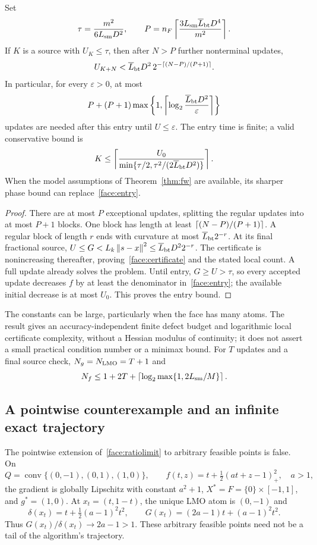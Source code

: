 \begin{corollary}
\label{face:local}
Set
\[
 \tau=\frac{m^2}{6L_{\rm sm}D^2},\qquad
 P=n_F\left\lceil\frac{3L_{\rm sm}\overline L_{\rm bt}D^4}{m^2}\right\rceil.
\]
If $K$ is a source with $U_K\le\tau$, then after $N>P$ further
nonterminal updates,
\begin{equation}\label{face:certificate}
 U_{K+N}<\overline L_{\rm bt}D^2\,2^{-\left\lceil(N-P)/(P+1)\right\rceil}.
\end{equation}
In particular, for every $\varepsilon>0$, at most
\begin{equation}\label{face:localcount}
 P+(P+1)\max\left\{1,
 \left\lceil\log_2\frac{\overline L_{\rm bt}D^2}{\varepsilon}\right\rceil\right\}
\end{equation}
updates are needed after this entry until $U\le\varepsilon$. The entry
time is finite; a valid conservative bound is
\begin{equation}\label{face:entry}
 K\le\left\lceil\frac{U_0}{\min\{\tau/2,\tau^2/(2\overline L_{\rm bt}D^2)\}}\right\rceil.
\end{equation}
When the model assumptions of Theorem~\ref{thm:fw} are available, its
sharper phase bound can replace~\eqref{face:entry}.
\end{corollary}
\begin{proof}
There are at most $P$ exceptional updates, splitting the regular
updates into at most $P+1$ blocks. One block has length at least
$\left\lceil(N-P)/(P+1)\right\rceil$. A regular block of length $r$ ends with
curvature at most $\overline L_{\rm bt}2^{-r}$. At its final
fractional source, $U\le G< L_k\left\|s-x\right\|^2\le
\overline L_{\rm bt}D^2 2^{-r}$. The certificate is nonincreasing
thereafter, proving~\eqref{face:certificate} and the stated local
count. A full update already solves the problem. Until entry,
$G\ge U>\tau$, so every accepted update decreases $f$ by at least
the denominator in~\eqref{face:entry}; the available initial decrease
is at most $U_0$. This proves the entry bound.
\end{proof}
The constants can be large, particularly when the face has many
atoms. The result gives an accuracy-independent finite defect budget
and logarithmic local certificate complexity, without a Hessian
modulus of continuity; it does not assert a small practical condition
number or a minimax bound. For $T$ updates and a final source check,
$N_g=N_{\rm LMO}=T+1$ and
\[
 N_f\le1+2T+\left\lceil\log_2\max\{1,2L_{\rm sm}/M\}\right\rceil.
\]

\subsection{A pointwise counterexample and an infinite exact trajectory}
\label{face:examples}
The pointwise extension of~\eqref{face:ratiolimit} to arbitrary feasible
points is false. On
\[
 Q=\operatorname{conv}\{(0,-1),(0,1),(1,0)\},\qquad
 f(t,z)=t+\tfrac12(at+z-1)_+^2,\quad a>1,
\]
the gradient is globally Lipschitz with constant $a^2+1$,
$X^*=F=\{0\}\times[-1,1]$, and $g^*=(1,0)$. At
$x_t=(t,1-t)$, the unique LMO atom is $(0,-1)$ and
\[
 \delta(x_t)=t+\tfrac12(a-1)^2t^2,\qquad
 G(x_t)=(2a-1)t+(a-1)^2t^2.
\]
Thus $G(x_t)/\delta(x_t)\to2a-1>1$. These arbitrary feasible
points need not be a tail of the algorithm's trajectory.

